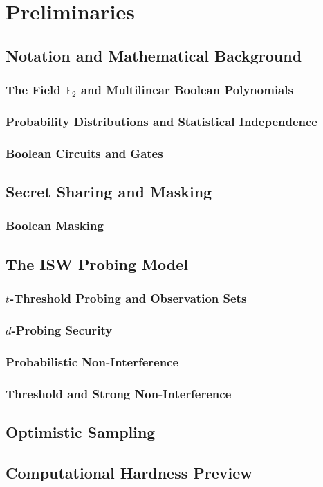 \chapter{Preliminaries}
\section{Notation and Mathematical Background}
  \subsection{The Field $\mathbb{F}_2$ and Multilinear Boolean Polynomials}
  \subsection{Probability Distributions and Statistical Independence}
  \subsection{Boolean Circuits and Gates}
\section{Secret Sharing and Masking}
  \subsection{Boolean Masking}
\section{The ISW Probing Model}
  \subsection{$t$-Threshold Probing and Observation Sets}
  \subsection{$d$-Probing Security}
  \subsection{Probabilistic Non-Interference}
  \subsection{Threshold and Strong Non-Interference}
\section{Optimistic Sampling}
\section{Computational Hardness Preview}
